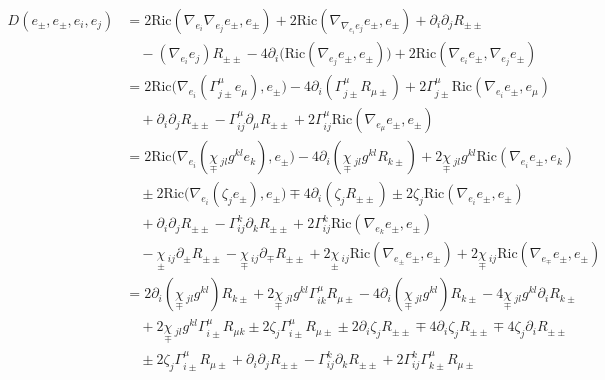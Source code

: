\documentclass[a4paper,11pt]{article}
\numberwithin{equation}{section}
\theoremstyle{definition}
\newcommand{\R}{{\mathrm{Ric}}}
\begin{document}
\begin{align*}
    D(e_\pm,e_\pm,e_i,e_j) 
    &= 2 \R(\nabla_{e_i}\nabla_{e_j} e_\pm ,e_\pm )
    + 2 \R(\nabla_{\nabla_{e_i}e_j} e_\pm ,e_\pm )
    + \partial_i \partial_j R_{\pm\pm}\\
    & \quad
    -(\nabla_{e_i} e_j) R_{\pm\pm}
    -4 \partial_i\big(\R(\nabla_{e_j} e_\pm , e_\pm )\big)
    + 2 \R(\nabla_{e_i} e_\pm , \nabla_{e_j} e_\pm )\\
    &= 2 \R\big(\nabla_{e_i}(\Gamma_{j\pm}^\mu e_\mu) ,e_\pm \big)
    -4 \partial_i(\Gamma_{j\pm}^\mu R_{\mu\pm})
    + 2 \Gamma_{j\pm}^\mu \R(\nabla_{e_i} e_\pm , e_\mu )\\
    & \quad
    + \partial_i \partial_j R_{\pm\pm}
    -\Gamma_{ij}^\mu \partial_\mu R_{\pm\pm}
    + 2 \Gamma_{ij}^\mu \R(\nabla_{e_\mu} e_\pm ,e_\pm )\\
    &= 2 \R\big(\nabla_{e_i}(\underset{\mp}{\chi}\,_{jl}g^{kl} e_k ) ,e_\pm \big)
    -4 \partial_i(\underset{\mp}{\chi}\,_{jl}g^{kl}  R_{k \pm})
    + 2 \underset{\mp}{\chi}\,_{jl}g^{kl}  \R(\nabla_{e_i} e_\pm , e_k  )\\
    &\quad
    \pm 2 \R\big(\nabla_{e_i}(\zeta_j e_\pm) ,e_\pm \big)
    \mp 4 \partial_i(\zeta_j R_{\pm\pm})
    \pm 2 \zeta_j \R(\nabla_{e_i} e_\pm , e_\pm )\\
    & \quad
    + \partial_i \partial_j R_{\pm\pm}
    -\Gamma_{ij}^k \partial_k R_{\pm\pm}
    + 2 \Gamma_{ij}^k \R(\nabla_{e_k} e_\pm ,e_\pm )\\
    & \quad
    -\underset{\pm}{\chi}\,_{ij} \partial_\pm R_{\pm\pm}
    -\underset{\mp}{\chi}\,_{ij} \partial_\mp R_{\pm\pm}
    + 2 \underset{\pm}{\chi}\,_{ij} \R(\nabla_{e_\pm} e_\pm ,e_\pm )
    + 2 \underset{\mp}{\chi}\,_{ij} \R(\nabla_{e_\mp} e_\pm ,e_\pm )\\
    &= 2 \partial_i(\underset{\mp}{\chi}\,_{jl}g^{kl}) R_{k\pm}
    + 2 \underset{\mp}{\chi}\,_{jl}g^{kl} \Gamma_{ik}^\mu R_{\mu\pm}
    -4 \partial_i(\underset{\mp}{\chi}\,_{jl}g^{kl})  R_{k \pm}
    -4 \underset{\mp}{\chi}\,_{jl}g^{kl}  \partial_i R_{k \pm}\\
    &\quad
    + 2 \underset{\mp}{\chi}\,_{jl}g^{kl} \Gamma_{i\pm}^\mu R_{\mu k}
    \pm 2 \zeta_j \Gamma_{i\pm}^\mu R_{\mu\pm}
    \pm 2 \partial_i \zeta_j R_{\pm\pm}
    \mp 4 \partial_i\zeta_j R_{\pm\pm}
    \mp 4 \zeta_j \partial_i R_{\pm\pm}\\
    & \quad
    \pm 2 \zeta_j \Gamma_{i\pm}^\mu R_{\mu\pm}
    + \partial_i \partial_j R_{\pm\pm}
    -\Gamma_{ij}^k \partial_k R_{\pm\pm}
    + 2 \Gamma_{ij}^k \Gamma_{k\pm}^\mu R_{\mu\pm}

\end{align*}
\end{document}
